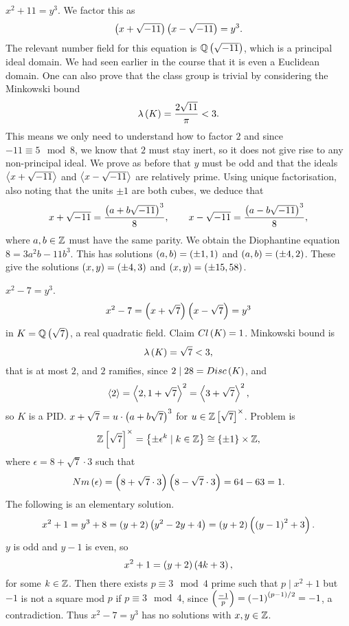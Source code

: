 \pagebreak

\begin{example*}
$ x^2 + 11 = y^3 $. We factor this as
$$ \left( x + \sqrt{-11} \right)\left( x - \sqrt{-11} \right) = y^3. $$
The relevant number field for this equation is $ \mathbb{Q}\left( \sqrt{-11} \right) $, which is a principal ideal domain. We had seen earlier in the course that it is even a Euclidean domain. One can also prove that the class group is trivial by considering the Minkowski bound
$$ \lambda\left( K \right) = \dfrac{2\sqrt{11}}{\pi} < 3. $$
This means we only need to understand how to factor $ 2 $ and since $ -11 \equiv 5 \mod 8 $, we know that $ 2 $ must stay inert, so it does not give rise to any non-principal ideal. We prove as before that $ y $ must be odd and that the ideals $ \left\langle x + \sqrt{-11} \right\rangle $ and $ \left\langle x - \sqrt{-11} \right\rangle $ are relatively prime. Using unique factorisation, also noting that the units $ \pm 1 $ are both cubes, we deduce that
$$ x + \sqrt{-11} = \dfrac{\left( a + b\sqrt{-11} \right)^3}{8}, \qquad x - \sqrt{-11} = \dfrac{\left( a - b\sqrt{-11} \right)^3}{8}, $$
where $ a, b \in \mathbb{Z} $ must have the same parity. We obtain the Diophantine equation $ 8 = 3a^2b - 11b^3 $. This has solutions $ \left( a, b \right) = \left( \pm 1, 1 \right) $ and $ \left( a, b \right) = \left( \pm 4, 2 \right) $. These give the solutions $ \left( x, y \right) = \left( \pm 4, 3 \right) $ and $ \left( x, y \right) = \left( \pm 15, 58 \right) $.
\end{example*}

\begin{example*}
$ x^2 - 7 = y^3 $.
$$ x^2 - 7 = \left( x + \sqrt{7} \right)\left( x - \sqrt{7} \right) = y^3 $$
in $ K = \mathbb{Q}\left( \sqrt{7} \right) $, a real quadratic field. Claim $ Cl\left( K \right) = 1 $. Minkowski bound is
$$ \lambda\left( K \right) = \sqrt{7} < 3, $$
that is at most $ 2 $, and $ 2 $ ramifies, since $ 2 \mid 28 = Disc\left( K \right) $, and
$$ \left\langle 2 \right\rangle = \left\langle 2, 1 + \sqrt{7} \right\rangle^2 = \left\langle 3 + \sqrt{7} \right\rangle^2, $$
so $ K $ is a PID. $ x + \sqrt{7} = u \cdot \left( a + b\sqrt{7} \right)^3 $ for $ u \in \mathbb{Z}\left[ \sqrt{7} \right]^\times $. Problem is
$$ \mathbb{Z}\left[ \sqrt{7} \right]^\times = \left\{ \pm\epsilon^k \mid k \in \mathbb{Z} \right\} \cong \left\{ \pm 1 \right\} \times \mathbb{Z}, $$
where $ \epsilon = 8 + \sqrt{7} \cdot 3 $ such that
$$ Nm\left( \epsilon \right) = \left( 8 + \sqrt{7} \cdot 3 \right)\left( 8 - \sqrt{7} \cdot 3 \right) = 64 - 63 = 1. $$
The following is an elementary solution.
$$ x^2 + 1 = y^3 + 8 = \left( y + 2 \right)\left( y^2 - 2y + 4 \right) = \left( y + 2 \right)\left( \left( y - 1 \right)^2 + 3 \right). $$
$ y $ is odd and $ y - 1 $ is even, so
$$ x^2 + 1 = \left( y + 2 \right)\left( 4k + 3 \right), $$
for some $ k \in \mathbb{Z} $. Then there exists $ p \equiv 3 \mod 4 $ prime such that $ p \mid x^2 + 1 $ but $ -1 $ is not a square mod $ p $ if $ p \equiv 3 \mod 4 $, since $ \left( \tfrac{-1}{p} \right) = \left( -1 \right)^{\left( p - 1 \right) / 2} = -1 $, a contradiction. Thus $ x^2 - 7 = y^3 $ has no solutions with $ x, y \in \mathbb{Z} $.
\end{example*}

